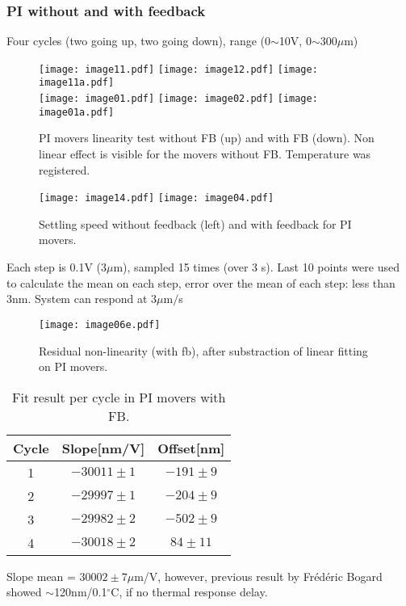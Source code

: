 \subsubsection{PI without and with feedback}
Four cycles (two going up, two going down),
range (0$\sim$10V, 0$\sim$300$\mu$m)\par
\begin{figure}
 \begin{center}
\texttt{[image: image11.pdf]}
\texttt{[image: image12.pdf]}
\texttt{[image: image11a.pdf]}\\
\texttt{[image: image01.pdf]}
\texttt{[image: image02.pdf]}
\texttt{[image: image01a.pdf]}\caption{PI movers linearity test without FB (up) and with FB (down). Non linear effect is visible for the movers without FB. Temperature was registered.}\label{f-PIlinearity}
\end{center}
\end{figure}
\begin{figure}
 \begin{center}
 \texttt{[image: image14.pdf]}
 \texttt{[image: image04.pdf]}
 \caption{Settling speed without feedback (left) and with feedback for PI movers.}
\end{center}
\end{figure}
Each step is 0.1V (3$\mu$m), sampled 15 times (over 3 s). Last 10 points were used to calculate the mean on each step, error over the mean of each step: less than 3nm. System can respond at 3$\mu$m$/$s\par
\begin{figure}
\begin{center}
 \texttt{[image: image06e.pdf]}\caption{Residual non-linearity (with fb), after substraction of linear fitting on PI movers.}\label{f-PIlinres}
\end{center}
\end{figure}
\begin{table}
\begin{center}
\begin{tabular}[]{|c|c|c|}\hline
 Cycle & Slope[nm/V] & Offset[nm] \\\hline
 {\color{red}1} & $-30011 \pm 1$& $-191\pm9$\\
{\color{green}2} & $-29997 \pm 1$& $-204\pm9$ \\
{\color{blue}3} & $-29982 \pm 2$& $-502\pm9$\\
{\color{magenta}4} & $-30018 \pm2$ & $84\pm11$\\\hline
\end{tabular}\caption{Fit result per cycle in PI movers with FB.}\label{t-PIfit}
\end{center}
\end{table}
Slope mean = $30002\pm7\mu$m/V, however, previous result by Frédéric Bogard showed $\sim$120nm/0.1$^\circ$C, if no thermal response delay.
